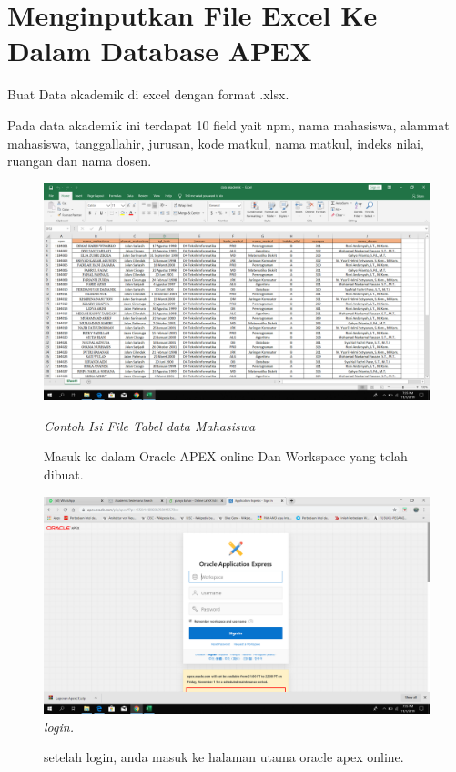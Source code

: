 \chapter{Menginputkan File Excel Ke Dalam Database APEX}

\begin{enumerate}
\item[1]Buat Data akademik di excel dengan format .xlsx.

Pada data akademik ini terdapat 10 field yait npm, nama mahasiswa, alammat mahasiswa, tanggallahir, jurusan, kode matkul, nama matkul, indeks nilai, ruangan dan nama dosen.
    \begin{figure}[!htbp]
    \begin{center}
    \includegraphics[scale=0.1]{figures/ss0.png}
    \caption{\textit{Contoh Isi File Tabel data Mahasiswa}}
    \end{center}   
\item[2]Masuk ke dalam Oracle APEX online Dan Workspace yang telah dibuat.

    \begin{center}
    \includegraphics[scale=0.2]{figures/ss15.png}
    \caption{\textit{login.}}
    \end{center}
    \end{figure}
\begin{figure}[!htbp]
\item[3]setelah login, anda masuk ke halaman utama oracle apex online.


\end{figure}
\end{enumerate}

